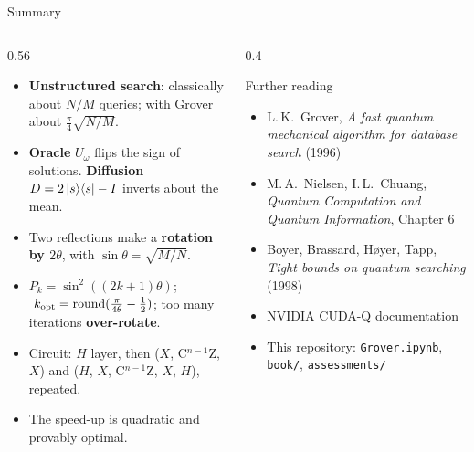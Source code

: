 \documentclass[aspectratio=169,11pt]{beamer}
\newcommand{\key}[1]{{\color{qdark}\textbf{#1}}}
\newcommand{\kopt}{k_{\rm opt}}
\newcommand{\Uo}{U_\omega}
\newcommand{\pj}[1]{\ket{#1}\!\bra{#1}}
\begin{document}
\begin{frame}{Summary}
  \begin{columns}[T]
    \begin{column}{0.56\textwidth}
      \small
      \begin{itemize}
        \item \key{Unstructured search}: classically about $N/M$ queries; with Grover about $\frac\pi4\sqrt{N/M}$.
        \item \key{Oracle} $\Uo$ flips the sign of solutions. \key{Diffusion} $D = 2\pj{s} - I$ inverts about the mean.
        \item Two reflections make a \key{rotation by $2\theta$}, with $\sin\theta = \sqrt{M/N}$.
        \item $P_k = \sin^2((2k+1)\theta)$; $\ \kopt = \mathrm{round}(\frac{\pi}{4\theta} - \frac12)$; too many iterations \key{over-rotate}.
        \item Circuit: $H$ layer, then ($X$, C$^{n-1}$Z, $X$) and ($H$, $X$, C$^{n-1}$Z, $X$, $H$), repeated.
        \item The speed-up is quadratic and provably optimal.
      \end{itemize}
    \end{column}
    \begin{column}{0.4\textwidth}
      \begin{block}{Further reading}
        \small
        \begin{itemize}
          \item L.\,K.\ Grover, \emph{A fast quantum mechanical algorithm for database search} (1996)
          \item M.\,A.\ Nielsen, I.\,L.\ Chuang, \emph{Quantum Computation and Quantum Information}, Chapter 6
          \item Boyer, Brassard, H{\o}yer, Tapp, \emph{Tight bounds on quantum searching} (1998)
          \item NVIDIA CUDA-Q documentation
          \item This repository: \texttt{Grover.ipynb}, \texttt{book/}, \texttt{assessments/}
        \end{itemize}
      \end{block}
    \end{column}
  \end{columns}
\end{frame}
\end{document}
